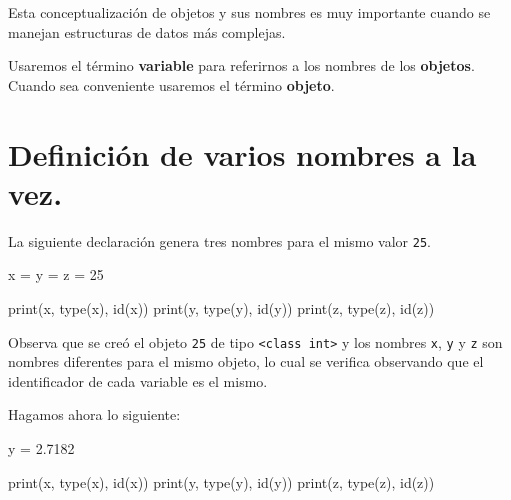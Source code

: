 \documentclass[
  spanish,
  letterpaper,
]{scrbook}
\newenvironment{Shaded}{\begin{snugshade}}{\end{snugshade}}
\newcommand{\BuiltInTok}[1]{\textcolor[rgb]{0.00,0.23,0.31}{#1}}
\newcommand{\DecValTok}[1]{\textcolor[rgb]{0.68,0.00,0.00}{#1}}
\newcommand{\FloatTok}[1]{\textcolor[rgb]{0.68,0.00,0.00}{#1}}
\newcommand{\NormalTok}[1]{\textcolor[rgb]{0.00,0.23,0.31}{#1}}
\newcommand{\OperatorTok}[1]{\textcolor[rgb]{0.37,0.37,0.37}{#1}}
\theoremstyle{definition}
\theoremstyle{remark}
\begin{document}
Esta conceptualización de objetos y sus nombres es muy importante cuando
se manejan estructuras de datos más complejas.

\begin{tcolorbox}[enhanced jigsaw, colframe=quarto-callout-note-color-frame, opacityback=0, toprule=.15mm, colback=white, coltitle=black, leftrule=.75mm, arc=.35mm, breakable, left=2mm, bottomtitle=1mm, rightrule=.15mm, bottomrule=.15mm, colbacktitle=quarto-callout-note-color!10!white, toptitle=1mm, titlerule=0mm, opacitybacktitle=0.6, title=\textcolor{quarto-callout-note-color}{\faInfo}\hspace{0.5em}{Nota.}]

Usaremos el término \textbf{variable} para referirnos a los nombres de
los \textbf{objetos}. Cuando sea conveniente usaremos el término
\textbf{objeto}.

\end{tcolorbox}

\section{Definición de varios nombres a la
vez.}\label{sec-a-varios-nombres}

La siguiente declaración genera tres nombres para el mismo valor
\texttt{25}.

\begin{Shaded}
\begin{Highlighting}[]
\NormalTok{x }\OperatorTok{=}\NormalTok{ y }\OperatorTok{=}\NormalTok{ z }\OperatorTok{=} \DecValTok{25}

\BuiltInTok{print}\NormalTok{(x, }\BuiltInTok{type}\NormalTok{(x), }\BuiltInTok{id}\NormalTok{(x))}
\BuiltInTok{print}\NormalTok{(y, }\BuiltInTok{type}\NormalTok{(y), }\BuiltInTok{id}\NormalTok{(y))}
\BuiltInTok{print}\NormalTok{(z, }\BuiltInTok{type}\NormalTok{(z), }\BuiltInTok{id}\NormalTok{(z))}
\end{Highlighting}
\end{Shaded}

Observa que se creó el objeto \texttt{25} de tipo
\texttt{\textless{}class\ \textquotesingle{}int\textquotesingle{}\textgreater{}}
y los nombres \texttt{x}, \texttt{y} y \texttt{z} son nombres diferentes
para el mismo objeto, lo cual se verifica observando que el
identificador de cada variable es el mismo.

Hagamos ahora lo siguiente:

\begin{Shaded}
\begin{Highlighting}[]
\NormalTok{y }\OperatorTok{=} \FloatTok{2.7182}

\BuiltInTok{print}\NormalTok{(x, }\BuiltInTok{type}\NormalTok{(x), }\BuiltInTok{id}\NormalTok{(x))}
\BuiltInTok{print}\NormalTok{(y, }\BuiltInTok{type}\NormalTok{(y), }\BuiltInTok{id}\NormalTok{(y))}
\BuiltInTok{print}\NormalTok{(z, }\BuiltInTok{type}\NormalTok{(z), }\BuiltInTok{id}\NormalTok{(z))}
\end{Highlighting}
\end{Shaded}
\end{document}
